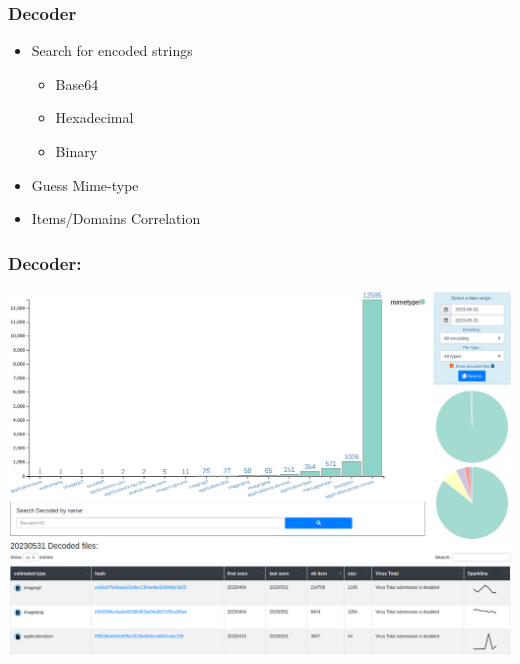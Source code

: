 \documentclass[10pt,aspectratio=169, colorlinks=true, linkcolor=circlBlue]{beamer}
\begin{document}

\begin{frame}
    \frametitle{Decoder}
    \begin{itemize}
    	\item Search for encoded strings
    		\begin{itemize}
				\item Base64
				\item Hexadecimal
				\item Binary
			\end{itemize}
    	\item Guess Mime-type
    	\item Items/Domains Correlation
    \end{itemize}
\end{frame}


\begin{frame}
    \frametitle{Decoder:}
    \centerline{
        \includegraphics[scale=0.23]{screenshot/decodeds_dashboard.png}
    }
\end{frame}
\end{document}
